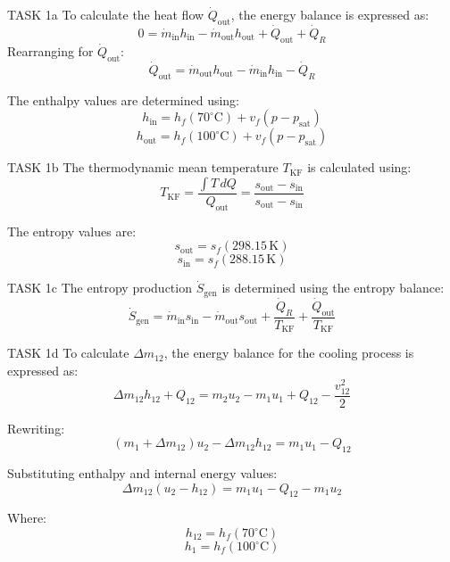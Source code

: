 TASK 1a  
To calculate the heat flow \( \dot{Q}_{\text{out}} \), the energy balance is expressed as:  
\[
0 = \dot{m}_{\text{in}} h_{\text{in}} - \dot{m}_{\text{out}} h_{\text{out}} + \dot{Q}_{\text{out}} + \dot{Q}_R
\]  
Rearranging for \( \dot{Q}_{\text{out}} \):  
\[
\dot{Q}_{\text{out}} = \dot{m}_{\text{out}} h_{\text{out}} - \dot{m}_{\text{in}} h_{\text{in}} - \dot{Q}_R
\]  

The enthalpy values are determined using:  
\[
h_{\text{in}} = h_f(70^\circ\text{C}) + v_f(p - p_{\text{sat}})
\]  
\[
h_{\text{out}} = h_f(100^\circ\text{C}) + v_f(p - p_{\text{sat}})
\]  

TASK 1b  
The thermodynamic mean temperature \( T_{\text{KF}} \) is calculated using:  
\[
T_{\text{KF}} = \frac{\int T \, dQ}{Q_{\text{out}}} = \frac{s_{\text{out}} - s_{\text{in}}}{s_{\text{out}} - s_{\text{in}}}
\]  

The entropy values are:  
\[
s_{\text{out}} = s_f(298.15 \, \text{K})
\]  
\[
s_{\text{in}} = s_f(288.15 \, \text{K})
\]  

TASK 1c  
The entropy production \( \dot{S}_{\text{gen}} \) is determined using the entropy balance:  
\[
\dot{S}_{\text{gen}} = \dot{m}_{\text{in}} s_{\text{in}} - \dot{m}_{\text{out}} s_{\text{out}} + \frac{\dot{Q}_R}{T_{\text{KF}}} + \frac{\dot{Q}_{\text{out}}}{T_{\text{KF}}}
\]  

TASK 1d  
To calculate \( \Delta m_{12} \), the energy balance for the cooling process is expressed as:  
\[
\Delta m_{12} h_{12} + Q_{12} = m_2 u_2 - m_1 u_1 + Q_{12} - \frac{v_{12}^2}{2}
\]  

Rewriting:  
\[
(m_1 + \Delta m_{12}) u_2 - \Delta m_{12} h_{12} = m_1 u_1 - Q_{12}
\]  

Substituting enthalpy and internal energy values:  
\[
\Delta m_{12} (u_2 - h_{12}) = m_1 u_1 - Q_{12} - m_1 u_2
\]  

Where:  
\[
h_{12} = h_f(70^\circ\text{C})
\]  
\[
h_1 = h_f(100^\circ\text{C})
\]